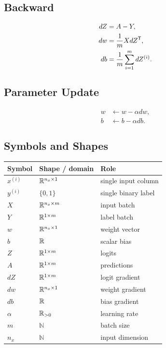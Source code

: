 \subsection{Backward}

\[
\begin{aligned}
dZ &= A - Y,\\
dw &= \frac{1}{m} X dZ^{\mathsf{T}},\\
db &= \frac{1}{m}\sum_{i=1}^{m} dZ^{(i)}.
\end{aligned}
\]

\subsection{Parameter Update}

\[
\begin{aligned}
w &\leftarrow w - \alpha dw,\\
b &\leftarrow b - \alpha db.
\end{aligned}
\]

\subsection{Symbols and Shapes}

\begin{center}
\begin{tabular}{lll}
\toprule
Symbol & Shape / domain & Role \\
\midrule
$x^{(i)}$ & $\mathbb{R}^{n_x \times 1}$ & single input column \\
$y^{(i)}$ & $\{0,1\}$ & single binary label \\
$X$ & $\mathbb{R}^{n_x \times m}$ & input batch \\
$Y$ & $\mathbb{R}^{1 \times m}$ & label batch \\
$w$ & $\mathbb{R}^{n_x \times 1}$ & weight vector \\
$b$ & $\mathbb{R}$ & scalar bias \\
$Z$ & $\mathbb{R}^{1 \times m}$ & logits \\
$A$ & $\mathbb{R}^{1 \times m}$ & predictions \\
$dZ$ & $\mathbb{R}^{1 \times m}$ & logit gradient \\
$dw$ & $\mathbb{R}^{n_x \times 1}$ & weight gradient \\
$db$ & $\mathbb{R}$ & bias gradient \\
$\alpha$ & $\mathbb{R}_{>0}$ & learning rate \\
$m$ & $\mathbb{N}$ & batch size \\
$n_x$ & $\mathbb{N}$ & input dimension \\
\bottomrule
\end{tabular}
\end{center}
